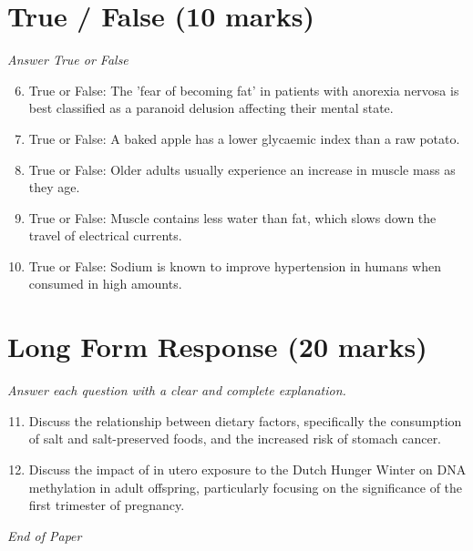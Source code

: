 \documentclass[12pt]{article}
\begin{document}
\section*{True / False (10 marks)}
\textit{Answer True or False}
\begin{enumerate}[label=\arabic*.]
\setcounter{enumi}{5}
\item True or False: The 'fear of becoming fat' in patients with anorexia nervosa is best classified as a paranoid delusion affecting their mental state.
\item True or False: A baked apple has a lower glycaemic index than a raw potato.
\item True or False: Older adults usually experience an increase in muscle mass as they age.
\item True or False: Muscle contains less water than fat, which slows down the travel of electrical currents.
\item True or False: Sodium is known to improve hypertension in humans when consumed in high amounts.
\end{enumerate}

\section*{Long Form Response (20 marks)}
\textit{Answer each question with a clear and complete explanation.}
\begin{enumerate}[label=\arabic*.]
\setcounter{enumi}{10}
\item Discuss the relationship between dietary factors, specifically the consumption of salt and salt-preserved foods, and the increased risk of stomach cancer.
\item Discuss the impact of in utero exposure to the Dutch Hunger Winter on DNA methylation in adult offspring, particularly focusing on the significance of the first trimester of pregnancy.
\end{enumerate}

\vfill
\noindent\textit{End of Paper}
\end{document}
